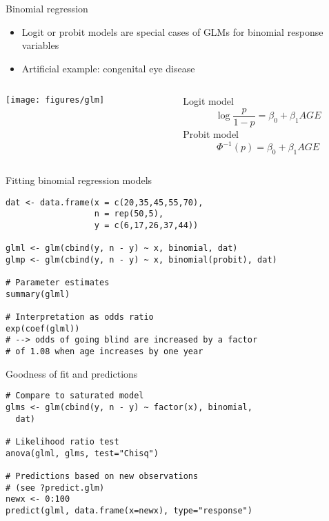 \documentclass{beamer}
\begin{document}
\begin{frame}{Binomial regression}
  \begin{itemize}
    \item Logit or probit models are special cases of GLMs for binomial
      response variables
    \item Artificial example: congenital eye disease
  \end{itemize}
\begin{columns}[c]
\begin{column}{6cm}
  \texttt{[image: figures/glm]}
\end{column}
\begin{column}{5cm}
Logit model
\[
  \log\frac{p}{1 - p} = \beta_0 + \beta_1 AGE
\]
Probit model
\[
  \Phi^{-1}(p) = \beta_0 + \beta_1 AGE
\]
\end{column}
\end{columns}
\end{frame}

{

\begin{frame}[fragile]{Fitting binomial regression models}
\begin{lstlisting}
dat <- data.frame(x = c(20,35,45,55,70), 
                  n = rep(50,5),
                  y = c(6,17,26,37,44))

glml <- glm(cbind(y, n - y) ~ x, binomial, dat)
glmp <- glm(cbind(y, n - y) ~ x, binomial(probit), dat)

# Parameter estimates
summary(glml)

# Interpretation as odds ratio
exp(coef(glml))
# --> odds of going blind are increased by a factor
# of 1.08 when age increases by one year
\end{lstlisting}
\end{frame}

\begin{frame}[fragile]{Goodness of fit and predictions}
\begin{lstlisting}
# Compare to saturated model
glms <- glm(cbind(y, n - y) ~ factor(x), binomial,
  dat)

# Likelihood ratio test
anova(glml, glms, test="Chisq")

# Predictions based on new observations
# (see ?predict.glm)
newx <- 0:100
predict(glml, data.frame(x=newx), type="response")
\end{lstlisting}
\end{frame}

}
\end{document}
